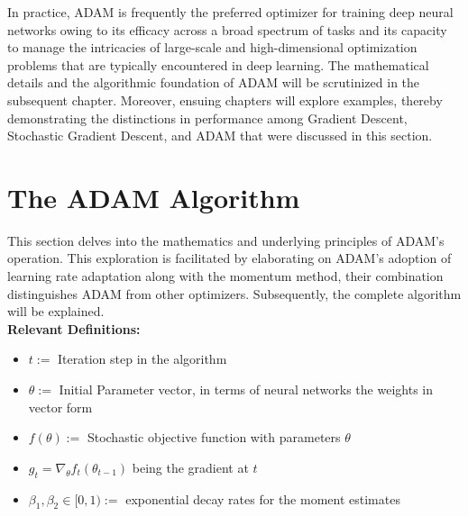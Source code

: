 \documentclass[journal]{IEEEtran}
\begin{document}
In practice, ADAM is frequently the preferred optimizer for training deep neural networks owing to its efficacy across a broad spectrum of tasks and its capacity to manage the intricacies of large-scale and high-dimensional optimization problems that are typically encountered in deep learning. The mathematical details and the algorithmic foundation of ADAM will be scrutinized in the subsequent chapter. Moreover, ensuing chapters will explore examples, thereby demonstrating the distinctions in performance among Gradient Descent, Stochastic Gradient Descent, and ADAM that were discussed in this section.


\section{The ADAM Algorithm}
This section delves into the mathematics and underlying principles of ADAM's operation. This exploration is facilitated by elaborating on ADAM's adoption of learning rate adaptation along with the momentum method, their combination distinguishes ADAM from other optimizers. Subsequently, the complete algorithm will be explained.\\
\textbf{Relevant Definitions:}
\begin{itemize}
    \item $t:=$ Iteration step in the algorithm
    \item $\theta:=$ Initial Parameter vector, in terms of neural networks the weights in vector form
    \item $f(\theta):=$ Stochastic objective function with parameters $\theta$
    \item $g_t= \nabla_{\theta} f_t(\theta_{t-1})$ being the gradient at $t$  
    \item $\beta_1, \beta_2 \in [0,1) :=$ exponential decay rates for the moment estimates
\end{itemize}
\end{document}
